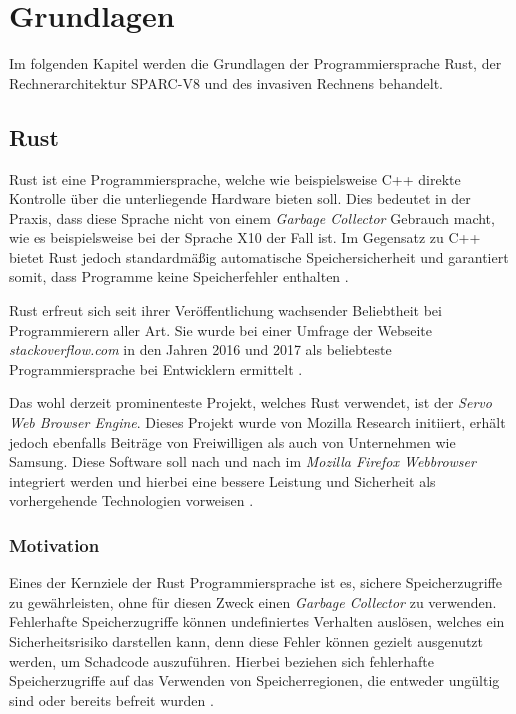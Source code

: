 \chapter{Grundlagen}\label{sec:basics}

Im folgenden Kapitel werden die Grundlagen der Programmiersprache Rust, der Rechnerarchitektur SPARC-V8 und
des invasiven Rechnens behandelt.

\section{Rust}

Rust ist eine Programmiersprache, welche wie beispielsweise C++ direkte Kontrolle über die
unterliegende Hardware bieten soll. Dies bedeutet in der Praxis, dass diese Sprache nicht von einem
\textit{Garbage Collector} Gebrauch macht, wie es beispielsweise bei der Sprache X10 der Fall ist.
Im Gegensatz zu C++ bietet Rust jedoch
standardmäßig automatische Speichersicherheit und garantiert somit, dass Programme keine Speicherfehler enthalten
\cite{theRustLanguage}.

Rust erfreut sich seit ihrer Veröffentlichung wachsender Beliebtheit bei Programmierern aller Art. Sie wurde
bei einer Umfrage der Webseite \textit{stackoverflow.com} in den Jahren 2016 und 2017 als beliebteste Programmiersprache bei
Entwicklern ermittelt \cite{stackoverflowSurvey}\cite{newStackoverflowSurvey}.

Das wohl derzeit prominenteste Projekt, welches Rust verwendet, ist der \textit{Servo Web Browser Engine}.
Dieses Projekt wurde von Mozilla Research initiiert, erhält jedoch ebenfalls Beiträge von Freiwilligen
als auch von Unternehmen wie Samsung.
Diese Software soll nach und nach im \textit{Mozilla Firefox Webbrowser} integriert werden und hierbei eine bessere
Leistung und Sicherheit als vorhergehende Technologien vorweisen \cite{engineeringServo}.

\subsection{Motivation}

Eines der Kernziele der Rust Programmiersprache ist es, sichere Speicherzugriffe zu gewährleisten, ohne
für diesen Zweck einen \textit{Garbage Collector} zu verwenden. Fehlerhafte Speicherzugriffe können undefiniertes
Verhalten auslösen, welches ein Sicherheitsrisiko darstellen kann, denn diese Fehler können gezielt ausgenutzt
werden, um Schadcode auszuführen. Hierbei beziehen sich fehlerhafte Speicherzugriffe auf das Verwenden von 
Speicherregionen, die entweder ungültig sind oder bereits befreit wurden
\cite{engineeringServo}\cite{undefinedBehaviour}.

